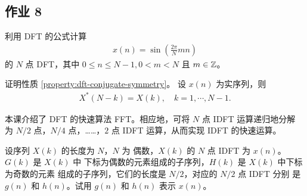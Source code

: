 \subsection{作业 8}

\begin{homework}
    利用 DFT 的公式计算
    \begin{align*}
        x(n) = \sin\left(\frac{2\pi}{N}mn\right)
    \end{align*}
    的 $N$ 点 DFT，其中 $0 \le n \le N - 1, 0 < m < N$ 且 $m \in \mathbb{Z}$。
\end{homework}

\begin{homework}
    证明性质 \ref{property:dft-conjugate-symmetry}。
    设 $x(n)$ 为实序列，则
    \begin{align*}
        X^*(N - k) = X(k), \quad k = 1, \cdots, N - 1.
    \end{align*}
\end{homework}

\begin{homework}
    本课介绍了 DFT 的快速算法 FFT。相应地，可将 $N$ 点 IDFT 运算递归地分解
    为 $N/2$ 点，$N/4$ 点，……，$2$ 点 IDFT 运算，从而实现 IDFT 的快速运算。

    设序列 $X(k)$ 的长度为 $N$，$N$ 为
    偶数，$X(k)$ 的 $N$ 点 IDFT 为 $x(n)$。$G(k)$ 是 $X(k)$ 中
    下标为偶数的元素组成的子序列，$H(k)$ 是 $X(k)$ 中下标为奇数的元素
    组成的子序列，它们的长度是 $N/2$，对应的 $N/2$ 点 IDFT 分别
    是 $g(n)$ 和 $h(n)$。试用 $g(n)$ 和 $h(n)$ 表示 $x(n)$。
\end{homework}
